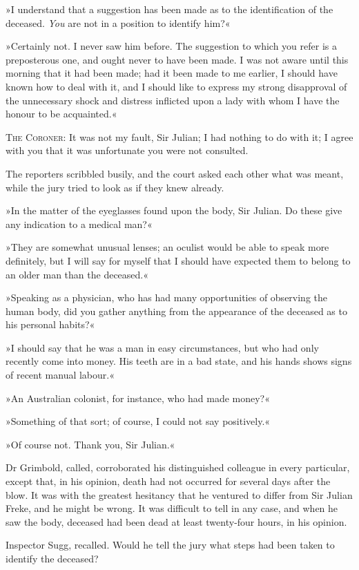»I understand that a suggestion has been made as to the identification of the deceased. \textit{You} are not in a position to identify him?«

»Certainly not. I never saw him before. The suggestion to which you refer is a preposterous one, and ought never to have been made. I was not aware until this morning that it had been made; had it been made to me earlier, I should have known how to deal with it, and I should like to express my strong disapproval of the unnecessary shock and distress inflicted upon a lady with whom I have the honour to be acquainted.«

\textsc{The Coroner}: It was not my fault, Sir Julian; I had nothing to do with it; I agree with you that it was unfortunate you were not consulted.

The reporters scribbled busily, and the court asked each other what was meant, while the jury tried to look as if they knew already.

»In the matter of the eyeglasses found upon the body, Sir Julian. Do these give any indication to a medical man?«

»They are somewhat unusual lenses; an oculist would be able to speak more definitely, but I will say for myself that I should have expected them to belong to an older man than the deceased.«

»Speaking as a physician, who has had many opportunities of observing the human body, did you gather anything from the appearance of the deceased as to his personal habits?«

»I should say that he was a man in easy circumstances, but who had only recently come into money. His teeth are in a bad state, and his hands shows signs of recent manual labour.«

»An Australian colonist, for instance, who had made money?«

»Something of that sort; of course, I could not say positively.«

»Of course not. Thank you, Sir Julian.«

Dr Grimbold, called, corroborated his distinguished colleague in every particular, except that, in his opinion, death had not occurred for several days after the blow. It was with the greatest hesitancy that he ventured to differ from Sir Julian Freke, and he might be wrong. It was difficult to tell in any case, and when he saw the body, deceased had been dead at least twenty-four hours, in his opinion.

Inspector Sugg, recalled. Would he tell the jury what steps had been taken to identify the deceased?

